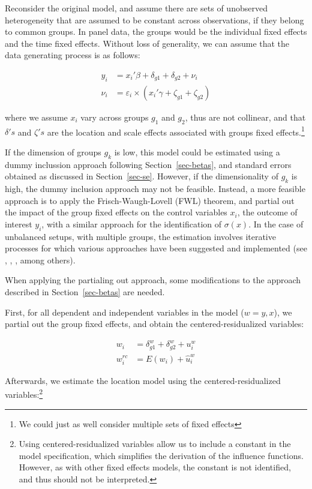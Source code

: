 \documentclass[
  authoryear,
  review,
  1p]{elsarticle}
\begin{document}
Reconsider the original model, and assume there are sets of unobserved
heterogeneity that are assumed to be constant across observations, if
they belong to common groups. In panel data, the groups would be the
individual fixed effects and the time fixed effects. Without loss of
generality, we can assume that the data generating process is as
follows:

\[\begin{aligned}
  y_{i} &= x_{i}' \beta + \delta_{g1} + \delta_{g2} + \nu_i \\
  \nu_i &= \varepsilon_i \times (x_{i}' \gamma + \zeta_{g1} + \zeta_{g2})   
  \end{aligned}
\]

where we assume \(x_{i}\) vary across groups \(g_1\) and \(g_2\), thus
are not collinear, and that \(\delta's\) and \(\zeta's\) are the
location and scale effects associated with groups fixed
effects.\footnote{We could just as well consider multiple sets of fixed
  effects}

If the dimension of groups \(g_k\) is low, this model could be estimated
using a dummy inclussion approach following Section~\ref{sec-betas}, and
standard errors obtained as discussed in Section~\ref{sec-se}. However,
if the dimensionality of \(g_k\) is high, the dummy inclusion approach
may not be feasible. Instead, a more feasible approach is to apply the
Frisch-Waugh-Lovell (FWL) theorem, and partial out the impact of the
group fixed effects on the control variables \(x_{i}\), the outcome of
interest \(y_{i}\), with a similar approach for the identification of
\(\sigma(x)\). In the case of unbalanced setups, with multiple groups,
the estimation involves iterative processes for which various approaches
have been suggested and implemented (see
\citet{correia_feasible_nodate}, \citet{gaure2013}, \citet{rios2015},
among others).

When applying the partialing out approach, some modifications to the
approach described in Section~\ref{sec-betas} are needed.

First, for all dependent and independent variables in the model
(\(w=y,x\)), we partial out the group fixed effects, and obtain the
centered-residualized variables:

\[\begin{aligned}
w_{i} &= \delta_{g1}^w + \delta_{g2}^w + u_{i}^w \\
w_{i}^{rc} &= E(w_{i}) + \hat{u}_{i}^w
\end{aligned}
\]

Afterwards, we estimate the location model using the
centered-residualized variables:\footnote{Using centered-residualized
  variables allow us to include a constant in the model specification,
  which simplifies the derivation of the influence functions. However,
  as with other fixed effects models, the constant is not identified,
  and thus should not be interpreted.}
\end{document}
